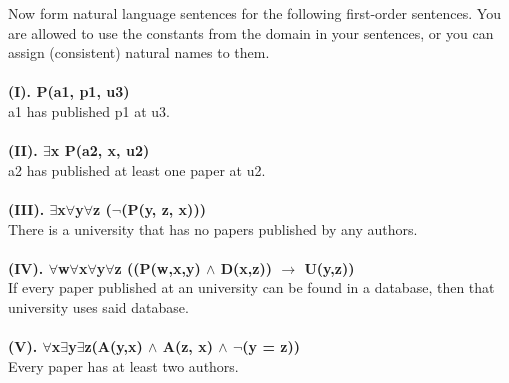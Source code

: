 \documentclass[a4paper]{article}
\begin{document}
Now form natural language sentences for the following first-order sentences. You are allowed to use
the constants from the domain in your sentences, or you can assign (consistent) natural names to
them.
\\\\
\textbf{(I). P(a1, p1, u3)}\\
a1 has published p1 at u3.
\\\\
\textbf{(II). $\exists $x P(a2, x, u2)}\\
a2 has published at least one paper at u2.
\\\\
\textbf{(III). $\exists $x$\forall $y$\forall $z ($\neg $(P(y, z, x)))}\\
There is a university that has no papers published by any authors.
\\\\
\textbf{(IV). $\forall $w$\forall $x$\forall $y$\forall $z ((P(w,x,y) $\wedge $ D(x,z)) $\rightarrow $ U(y,z)) }\\
If every paper published at an university can be found in a database, then that university uses said database.
\\\\
\textbf{(V). $\forall $x$\exists $y$\exists $z(A(y,x) $\wedge $ A(z, x) $\wedge $ $\neg $(y = z))}\\
Every paper has at least two authors.
\\\\

\newpage
\end{document}
